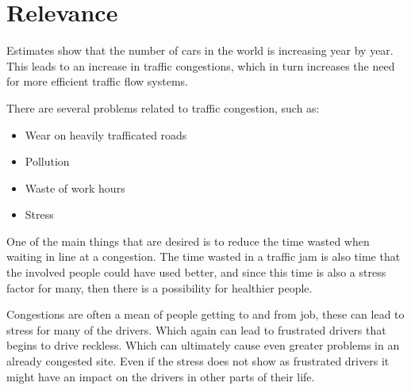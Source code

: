 \section{Relevance}
Estimates show that the number of cars in the world is increasing year by year\cite{WardsAuto:CarPopulation}. This leads to an increase in traffic congestions, which in turn increases the need for more efficient traffic flow systems.

There are several problems related to traffic congestion, such as:
\begin{itemize}
	\item Wear on heavily trafficated roads
	\item Pollution
	\item Waste of work hours
	\item Stress
\end{itemize}

One of the main things that are desired is to reduce the time wasted when waiting in line at a congestion.
The time wasted in a traffic jam is also time that the involved people could have used better, and since this time is also a stress factor for many, then there is a possibility for healthier people.

Congestions are often a mean of people getting to and from job, these can lead to stress for many of the drivers. Which again can lead to frustrated drivers that begins to drive reckless. Which can ultimately cause even greater problems in an already congested site. Even if the stress does not show as frustrated drivers it might have an impact on the drivers in other parts of their life.
